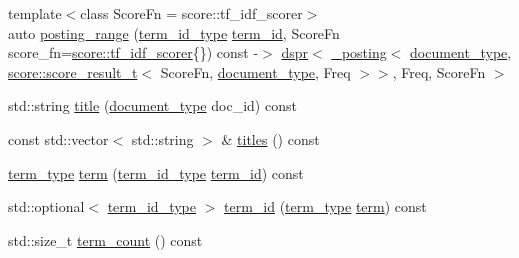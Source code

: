 \begin{DoxyCompactItemize}
\item 
{\footnotesize template$<$class Score\+Fn  = score\+::tf\+\_\+idf\+\_\+scorer$>$ }\\auto \mbox{\hyperlink{classirk_1_1inverted__index_adde74983c6f5bab062296561b3b0b010}{posting\+\_\+range}} (\mbox{\hyperlink{classirk_1_1inverted__index_aac7579f5261c795a6f19a7f700b57b2b}{term\+\_\+id\+\_\+type}} \mbox{\hyperlink{classirk_1_1inverted__index_accd0efb6f27eea7853d45548a6bb0e7d}{term\+\_\+id}}, Score\+Fn score\+\_\+fn=\mbox{\hyperlink{structirk_1_1score_1_1tf__idf__scorer}{score\+::tf\+\_\+idf\+\_\+scorer}}\{\}) const -\/$>$ \mbox{\hyperlink{namespaceirk_af92c7aae439f59ccae252f027f851c24}{dspr}}$<$ \mbox{\hyperlink{structirk_1_1__posting}{\+\_\+posting}}$<$ \mbox{\hyperlink{classirk_1_1inverted__index_ab708a9d1605de705341f3ed81bd7d5e7}{document\+\_\+type}}, \mbox{\hyperlink{namespaceirk_1_1score_af4a2c84b3548a4ac12aac3862bc94875}{score\+::score\+\_\+result\+\_\+t}}$<$ Score\+Fn, \mbox{\hyperlink{classirk_1_1inverted__index_ab708a9d1605de705341f3ed81bd7d5e7}{document\+\_\+type}}, Freq $>$$>$, Freq, Score\+Fn $>$
\item 
std\+::string \mbox{\hyperlink{classirk_1_1inverted__index_aa2aa71522e78ec5e29fa30b56c434702}{title}} (\mbox{\hyperlink{classirk_1_1inverted__index_ab708a9d1605de705341f3ed81bd7d5e7}{document\+\_\+type}} doc\+\_\+id) const
\item 
const std\+::vector$<$ std\+::string $>$ \& \mbox{\hyperlink{classirk_1_1inverted__index_ac3c5100fced55578e115553c8cda9080}{titles}} () const
\item 
\mbox{\hyperlink{classirk_1_1inverted__index_a7a60c2cec1774c08f21e8e27ccb5ac33}{term\+\_\+type}} \mbox{\hyperlink{classirk_1_1inverted__index_af6d217382bf3bed6b19a009cb0274148}{term}} (\mbox{\hyperlink{classirk_1_1inverted__index_aac7579f5261c795a6f19a7f700b57b2b}{term\+\_\+id\+\_\+type}} \mbox{\hyperlink{classirk_1_1inverted__index_accd0efb6f27eea7853d45548a6bb0e7d}{term\+\_\+id}}) const
\item 
std\+::optional$<$ \mbox{\hyperlink{classirk_1_1inverted__index_aac7579f5261c795a6f19a7f700b57b2b}{term\+\_\+id\+\_\+type}} $>$ \mbox{\hyperlink{classirk_1_1inverted__index_accd0efb6f27eea7853d45548a6bb0e7d}{term\+\_\+id}} (\mbox{\hyperlink{classirk_1_1inverted__index_a7a60c2cec1774c08f21e8e27ccb5ac33}{term\+\_\+type}} \mbox{\hyperlink{classirk_1_1inverted__index_af6d217382bf3bed6b19a009cb0274148}{term}}) const
\item 
std\+::size\+\_\+t \mbox{\hyperlink{classirk_1_1inverted__index_a5ae0fe7ce408b154daeadcca6a879ca7}{term\+\_\+count}} () const
\end{DoxyCompactItemize}


